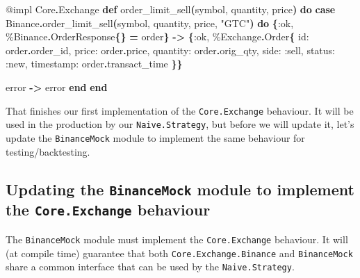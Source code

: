 \documentclass[
  oneside]{book}
\newenvironment{Shaded}{\begin{snugshade}}{\end{snugshade}}
\newcommand{\ConstantTok}[1]{\textcolor[rgb]{0.56,0.35,0.01}{#1}}
\newcommand{\FunctionTok}[1]{\textcolor[rgb]{0.13,0.29,0.53}{\textbf{#1}}}
\newcommand{\KeywordTok}[1]{\textcolor[rgb]{0.13,0.29,0.53}{\textbf{#1}}}
\newcommand{\NormalTok}[1]{#1}
\newcommand{\OperatorTok}[1]{\textcolor[rgb]{0.81,0.36,0.00}{\textbf{#1}}}
\newcommand{\OtherTok}[1]{\textcolor[rgb]{0.56,0.35,0.01}{#1}}
\newcommand{\StringTok}[1]{\textcolor[rgb]{0.31,0.60,0.02}{#1}}
\newcommand{\VariableTok}[1]{\textcolor[rgb]{0.00,0.00,0.00}{#1}}
\begin{document}
\begin{Shaded}
\begin{Highlighting}[]
  \OtherTok{@impl} \ConstantTok{Core}\OperatorTok{.}\ConstantTok{Exchange}
  \KeywordTok{def}\NormalTok{ order\_limit\_sell}\FunctionTok{(}\NormalTok{symbol, quantity, price}\FunctionTok{)} \KeywordTok{do}
    \KeywordTok{case} \ConstantTok{Binance}\OperatorTok{.}\NormalTok{order\_limit\_sell}\FunctionTok{(}\NormalTok{symbol, quantity, price, }\StringTok{"GTC"}\FunctionTok{)} \KeywordTok{do}
      \FunctionTok{\{}\VariableTok{:ok}\NormalTok{, \%}\ConstantTok{Binance}\OperatorTok{.}\ConstantTok{OrderResponse}\FunctionTok{\{\}} \OperatorTok{=}\NormalTok{ order}\FunctionTok{\}} \OperatorTok{{-}\textgreater{}}
        \FunctionTok{\{}\VariableTok{:ok}\NormalTok{,}
\NormalTok{         \%}\ConstantTok{Exchange}\OperatorTok{.}\ConstantTok{Order}\FunctionTok{\{}
           \VariableTok{id:}\NormalTok{ order}\OperatorTok{.}\NormalTok{order\_id,}
           \VariableTok{price:}\NormalTok{ order}\OperatorTok{.}\NormalTok{price,}
           \VariableTok{quantity:}\NormalTok{ order}\OperatorTok{.}\NormalTok{orig\_qty,}
           \VariableTok{side:} \VariableTok{:sell}\NormalTok{,}
           \VariableTok{status:} \VariableTok{:new}\NormalTok{,}
           \VariableTok{timestamp:}\NormalTok{ order}\OperatorTok{.}\NormalTok{transact\_time}
         \FunctionTok{\}\}}

\NormalTok{      error }\OperatorTok{{-}\textgreater{}}
\NormalTok{        error}
    \KeywordTok{end}
  \KeywordTok{end}
\end{Highlighting}
\end{Shaded}

That finishes our first implementation of the \texttt{Core.Exchange} behaviour. It will be used in the production by our \texttt{Naive.Strategy}, but before we will update it, let's update the \texttt{BinanceMock} module to implement the same behaviour for testing/backtesting.

\subsection{\texorpdfstring{Updating the \texttt{BinanceMock} module to implement the \texttt{Core.Exchange} behaviour}{Updating the BinanceMock module to implement the Core.Exchange behaviour}}\label{updating-the-binancemock-module-to-implement-the-core.exchange-behaviour}

The \texttt{BinanceMock} module must implement the \texttt{Core.Exchange} behaviour. It will (at compile time) guarantee that both \texttt{Core.Exchange.Binance} and \texttt{BinanceMock} share a common interface that can be used by the \texttt{Naive.Strategy}.
\end{document}
